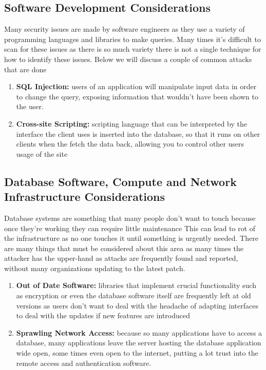 \documentclass[sigconf]{acmart}
\begin{document}
\subsection{Software Development Considerations}

Many security issues are made by software engineers as they use a variety of programming languages and libraries to make queries. Many times it's difficult to scan for these issues as there is so much variety there is not a single technique for how to identify these issues. Below we will discuss a couple of common attacks that are done 

\begin{enumerate}
    \item \textbf{SQL Injection:} users of an application will manipulate input data in order to change the query, exposing information that wouldn't have been shown to the user.
    
    \item \textbf{Cross-site Scripting:} scripting language that can be interpreted by the interface the client uses is inserted into the database, so that it runs on other clients when the fetch the data back, allowing you to control other users usage of the site
\end{enumerate}

\subsection{Database Software, Compute and Network Infrastructure Considerations}

Database systems are something that many people don't want to touch because once they're working they can require little maintenance This can lead to rot of the infrastructure as no one touches it until something is urgently needed. There are many things that must be considered about this area as many times the attacker has the upper-hand as attacks are frequently found and reported, without many organizations updating to the latest patch.

\begin{enumerate}
    \item \textbf{Out of Date Software:} libraries that implement crucial functionality such as encryption or even the database software itself are frequently left at old versions as users don't want to deal with the headache of adapting interfaces to deal with the updates if new features are introduced
    \item \textbf{Sprawling Network Access:} because so many applications have to access a database, many applications leave the server hosting the database application wide open, some times even open to the internet, putting a lot trust into the remote access and authentication software.
\end{enumerate}
\end{document}
